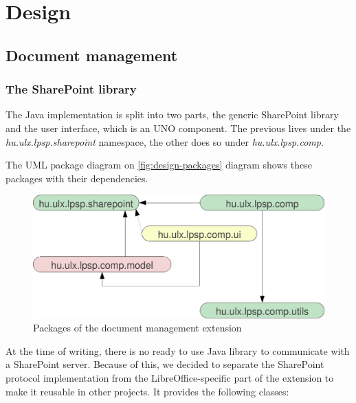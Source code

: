 \chapter{Design}
\label{chap:design}

\section{Document management}

\subsection{The SharePoint library}

The Java implementation is split into two parts, the generic SharePoint library
and the user interface, which is an UNO component. The previous lives under the
\emph{hu.ulx.lpsp.sharepoint} namespace, the other does so under
\emph{hu.ulx.lpsp.comp}.

The UML package diagram on \autoref{fig:design-packages} diagram shows these
packages with their dependencies.

\begin{figure}[H]
\centering
\includegraphics[width=425px,keepaspectratio]{design-packages.pdf}
\caption{Packages of the document management extension}
\label{fig:design-packages}
\end{figure}

At the time of writing, there is no ready to use Java library to communicate
with a SharePoint server. Because of this, we decided to separate the SharePoint
protocol implementation from the LibreOffice-specific part of the extension to
make it reusable in other projects. It provides the following classes:

